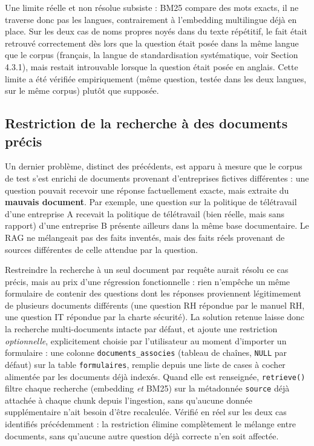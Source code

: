 \documentclass[12pt,a4paper]{report}
\begin{document}
Une limite réelle et non résolue subsiste : BM25 compare des mots
exacts, il ne traverse donc pas les langues, contrairement à l'embedding
multilingue déjà en place. Sur les deux cas de noms propres noyés dans
du texte répétitif, le fait était retrouvé correctement dès lors que la
question était posée dans la même langue que le corpus (français, la
langue de standardisation systématique, voir Section 4.3.1), mais
restait introuvable lorsque la question était posée en anglais. Cette
limite a été vérifiée empiriquement (même question, testée dans les deux
langues, sur le même corpus) plutôt que supposée.

\subsection{Restriction de la recherche à des documents précis}
\label{subsec:restriction-documents}

Un dernier problème, distinct des précédents, est apparu à mesure que le
corpus de test s'est enrichi de documents provenant d'entreprises
fictives différentes : une question pouvait recevoir une réponse
factuellement exacte, mais extraite du \textbf{mauvais document}. Par
exemple, une question sur la politique de télétravail d'une entreprise
A recevait la politique de télétravail (bien réelle, mais sans rapport)
d'une entreprise B présente ailleurs dans la même base documentaire.
Le RAG ne mélangeait pas des faits inventés, mais des faits réels
provenant de sources différentes de celle attendue par la question.

Restreindre la recherche à un seul document par requête aurait résolu
ce cas précis, mais au prix d'une régression fonctionnelle : rien
n'empêche un même formulaire de contenir des questions dont les
réponses proviennent légitimement de plusieurs documents différents
(une question RH répondue par le manuel RH, une question IT répondue
par la charte sécurité). La solution retenue laisse donc la recherche
multi-documents intacte par défaut, et ajoute une restriction
\emph{optionnelle}, explicitement choisie par l'utilisateur au moment
d'importer un formulaire : une colonne \texttt{documents\_associes}
(tableau de chaînes, \texttt{NULL} par défaut) sur la table
\texttt{formulaires}, remplie depuis une liste de cases à cocher
alimentée par les documents déjà indexés. Quand elle est renseignée,
\texttt{retrieve()} filtre chaque recherche (embedding \emph{et} BM25)
sur la métadonnée \texttt{source} déjà attachée à chaque chunk depuis
l'ingestion, sans qu'aucune donnée supplémentaire n'ait besoin d'être
recalculée. Vérifié en réel sur les deux cas identifiés précédemment :
la restriction élimine complètement le mélange entre documents, sans
qu'aucune autre question déjà correcte n'en soit affectée.
\end{document}

